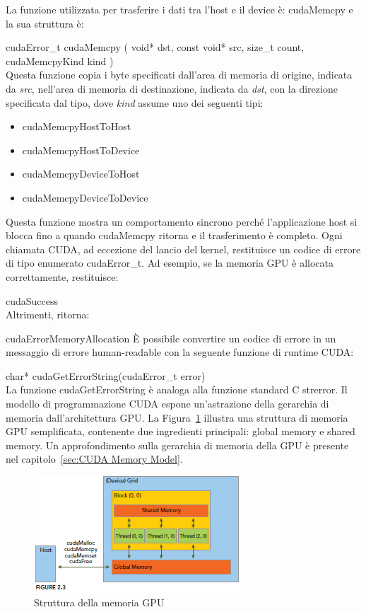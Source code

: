 La funzione utilizzata per trasferire i dati tra l'host e il device è: cudaMemcpy e la sua struttura è:


cudaError\_t cudaMemcpy ( void* dst, const void* src, size\_t count, cudaMemcpyKind kind )\\
Questa funzione copia i byte specificati dall'area di memoria di origine, indicata da \emph{src}, nell'area di memoria di destinazione, indicata da \emph{dst}, con la direzione specificata dal tipo, dove \emph{kind} assume uno dei seguenti tipi:
\begin{itemize}
	\item cudaMemcpyHostToHost
	\item cudaMemcpyHostToDevice
	\item cudaMemcpyDeviceToHost
	\item cudaMemcpyDeviceToDevice
\end{itemize}
Questa funzione mostra un comportamento sincrono perché l'applicazione host si blocca fino a quando cudaMemcpy ritorna e il trasferimento è completo. Ogni chiamata CUDA, ad eccezione del lancio del kernel, restituisce un codice di errore di tipo enumerato cudaError\_t. Ad esempio, se la memoria GPU è allocata correttamente, restituisce:

cudaSuccess\\
Altrimenti, ritorna:

cudaErrorMemoryAllocation
È possibile convertire un codice di errore in un messaggio di errore human-readable con la seguente funzione di runtime CUDA:

char* cudaGetErrorString(cudaError\_t error)\\
La funzione cudaGetErrorString è analoga alla funzione standard C strerror.
Il modello di programmazione CUDA espone un'astrazione della gerarchia di memoria dall'architettura GPU. La Figura~\ref{fig:GPU_Memory_Structure} illustra una struttura di memoria GPU semplificata, contenente due ingredienti principali: global memory e shared memory. Un approfondimento sulla gerarchia di memoria della GPU è presente nel capitolo~\ref{sec:CUDA Memory Model}.
\begin{figure}[h!]
	\centering
	\includegraphics[width=.85\textwidth]{Immagini/CUDA/GPU_Memory_Structure}
	\caption{Struttura della memoria GPU \cite{Cheng:ProfessionalCudaProgramming}}
	\label{fig:GPU_Memory_Structure}
\end{figure}
